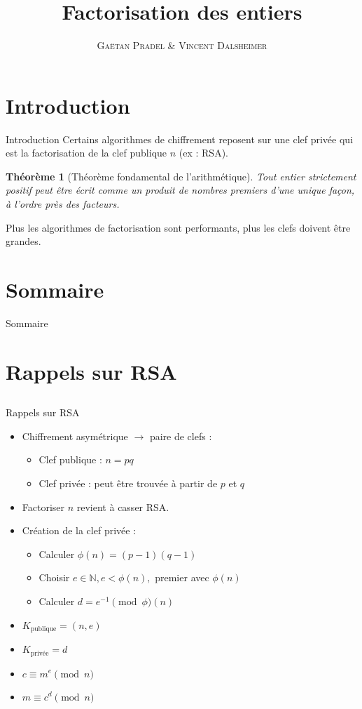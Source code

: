 \documentclass[utf8,10pt,french]{beamer}
\title[FdE]{Factorisation des entiers}
\author[GV]{\textsc{Gaëtan Pradel \& Vincent Dalsheimer}}
\institute{Université Bordeaux 1}
\newtheorem{theoreme}{Th{\'e}or{\`e}me}
\newcommand{\N}{\mathbb{N}}
\begin{document}
\frame{\titlepage}

\section{Introduction}
\begin{frame}{Introduction}
Certains algorithmes de chiffrement reposent sur une clef privée qui est la factorisation de la clef publique $n$ (ex : RSA). \pause

\begin{theoreme}[Théorème fondamental de l'arithmétique]
Tout entier strictement positif peut être écrit comme un produit de nombres premiers d’une
unique façon, à l’ordre près des facteurs. \pause
\end{theoreme}

Plus les algorithmes de factorisation sont performants, plus les clefs doivent être grandes.
\end{frame}

\section*{Sommaire}
\begin{frame}{Sommaire}
  \tableofcontents
\end{frame}

\section{Rappels sur RSA}
\subsection{}
\begin{frame}{Rappels sur RSA}
\begin{itemize}
\item Chiffrement asymétrique $\to$ paire de clefs :\pause
\begin{itemize}
\item Clef publique : $n = pq$ \pause
\item Clef privée : peut être trouvée à partir de $p$ et $q$ \pause
\end{itemize}
\item Factoriser $n$ revient à casser RSA. \pause
\item Création de la clef privée : \pause 
\begin{itemize}
\item Calculer $\phi(n) = (p - 1)(q - 1)$ \pause
\item Choisir $e \in \N, e < \phi(n),$ premier avec $\phi(n)$ \pause
\item Calculer $d = e^{-1} \pmod \phi(n)$ \pause
\end{itemize}
\item $K_{\text{publique}} = (n, e)$ \pause
\item $K_{\text{privée}} = d$ \pause
\item $c \equiv m^e \pmod n$ \pause
\item $m \equiv c^d \pmod n$
\end{itemize}
\end{frame}
\end{document}
